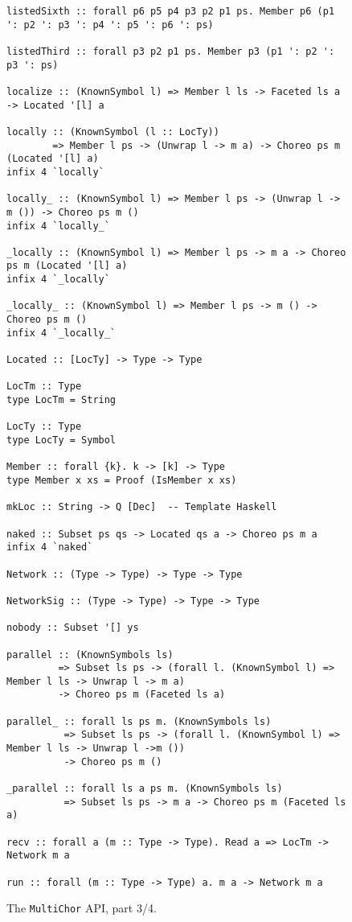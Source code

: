 \documentclass[sigplan,screen,review,anonymous]{acmart}
\newcommand{\MultiChor}{\texttt{Multi\-Chor}\xspace}
\begin{document}
\begin{figure*}\ContinuedFloat
\begin{mdframed}
\begin{verbatim}
listedSixth :: forall p6 p5 p4 p3 p2 p1 ps. Member p6 (p1 ': p2 ': p3 ': p4 ': p5 ': p6 ': ps)

listedThird :: forall p3 p2 p1 ps. Member p3 (p1 ': p2 ': p3 ': ps)

localize :: (KnownSymbol l) => Member l ls -> Faceted ls a -> Located '[l] a

locally :: (KnownSymbol (l :: LocTy))
        => Member l ps -> (Unwrap l -> m a) -> Choreo ps m (Located '[l] a)
infix 4 `locally`

locally_ :: (KnownSymbol l) => Member l ps -> (Unwrap l -> m ()) -> Choreo ps m ()
infix 4 `locally_`

_locally :: (KnownSymbol l) => Member l ps -> m a -> Choreo ps m (Located '[l] a)
infix 4 `_locally`

_locally_ :: (KnownSymbol l) => Member l ps -> m () -> Choreo ps m ()
infix 4 `_locally_`

Located :: [LocTy] -> Type -> Type

LocTm :: Type
type LocTm = String

LocTy :: Type
type LocTy = Symbol

Member :: forall {k}. k -> [k] -> Type
type Member x xs = Proof (IsMember x xs)

mkLoc :: String -> Q [Dec]  -- Template Haskell

naked :: Subset ps qs -> Located qs a -> Choreo ps m a
infix 4 `naked`

Network :: (Type -> Type) -> Type -> Type

NetworkSig :: (Type -> Type) -> Type -> Type

nobody :: Subset '[] ys

parallel :: (KnownSymbols ls)
         => Subset ls ps -> (forall l. (KnownSymbol l) => Member l ls -> Unwrap l -> m a)
         -> Choreo ps m (Faceted ls a)

parallel_ :: forall ls ps m. (KnownSymbols ls)
          => Subset ls ps -> (forall l. (KnownSymbol l) => Member l ls -> Unwrap l ->m ())
          -> Choreo ps m ()

_parallel :: forall ls a ps m. (KnownSymbols ls)
          => Subset ls ps -> m a -> Choreo ps m (Faceted ls a)

recv :: forall a (m :: Type -> Type). Read a => LocTm -> Network m a

run :: forall (m :: Type -> Type) a. m a -> Network m a
\end{verbatim}
\caption{The \MultiChor API, part 3/4.}
\end{mdframed}
\end{figure*}
\end{document}
